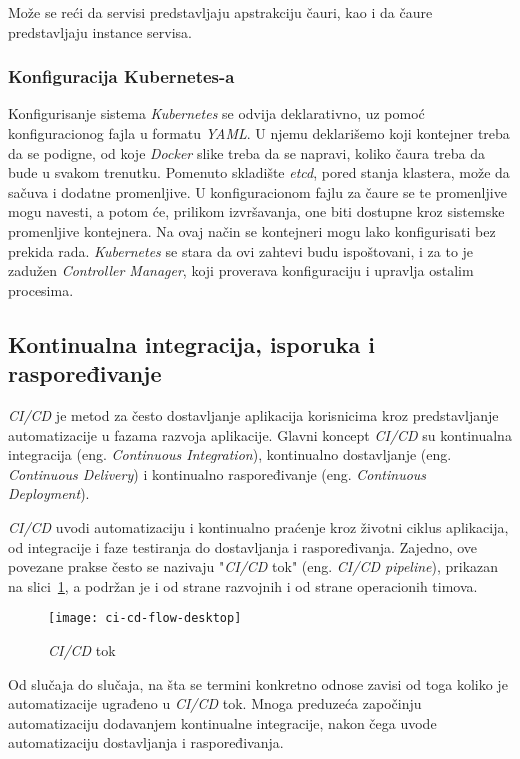 Može se reći da servisi predstavljaju apstrakciju čauri, kao i da čaure predstavljaju instance servisa.

\subsubsection{Konfiguracija Kubernetes-a}
Konfigurisanje sistema \textit{Kubernetes} se odvija deklarativno, uz pomoć konfiguracionog fajla u formatu \textit{YAML}. U njemu deklarišemo
koji kontejner treba da se podigne, od koje \textit{Docker} slike treba da se napravi, koliko čaura treba 
da bude u svakom trenutku. Pomenuto skladište {\em etcd}, pored stanja klastera, može da sačuva i dodatne promenljive.
U konfiguracionom fajlu za čaure se te promenljive mogu navesti, a potom će, prilikom izvršavanja, one biti 
dostupne kroz sistemske promenljive kontejnera. Na ovaj način se kontejneri mogu lako konfigurisati bez prekida rada. 
\textit{Kubernetes} se stara da ovi zahtevi budu ispoštovani, i za to je zadužen \textit{Controller Manager}, 
koji proverava konfiguraciju i upravlja ostalim procesima. 


\subsection{Kontinualna integracija, isporuka i raspoređivanje}\label{sec:arhitektura-ci_cd}

\textit{CI/CD} je metod za često dostavljanje aplikacija korisnicima kroz predstavljanje automatizacije u 
fazama razvoja aplikacije. Glavni koncept \textit{CI/CD} su kontinualna integracija (eng. 
\textit{Continuous Integration}), kontinualno dostavljanje (eng. \textit{Continuous Delivery}) i 
kontinualno raspoređivanje (eng. \textit{Continuous Deployment}).

\textit{CI/CD} uvodi automatizaciju i kontinualno praćenje kroz životni ciklus aplikacija, 
od integracije i faze testiranja do dostavljanja i raspoređivanja. Zajedno, ove povezane prakse 
često se nazivaju "\textit{CI/CD} tok" (eng. \textit{CI/CD pipeline}), prikazan na slici~\ref{fig:cicd}, 
a podržan je i od strane razvojnih i od strane operacionih timova.

\begin{figure}[h]
    \centering
    \texttt{[image: ci-cd-flow-desktop]}
    \caption{\textit{CI/CD} tok}
    \label{fig:cicd}
\end{figure}

Od slučaja do slučaja, na šta se termini konkretno odnose zavisi od toga koliko je automatizacije 
ugrađeno u \textit{CI/CD} tok. Mnoga preduzeća započinju automatizaciju dodavanjem kontinualne integracije, 
nakon čega uvode automatizaciju dostavljanja i raspoređivanja.

